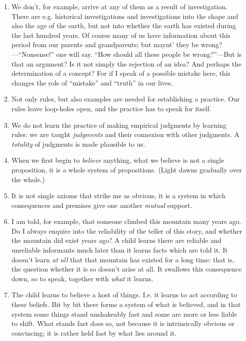 \documentclass{book}
\begin{document}
\begin{enumerate}
\item
We don't, for example, arrive at any of them as a result of investigation.
There are e.g. historical investigations and investigations into the shape and
also the age of the earth, but not into whether the earth has existed during
the last hundred years. Of course many of us have information about this period
from our parents and grandparents; but maynt' they be wrong?---``Nonsense!''
one will say. ``How should all these people be wrong?''---But is that an
argument? Is it not simply the rejection of an idea? And perhaps the
determination of a concept? For if I speak of a possible mistake here, this
changes the role of ``mistake'' and ``truth'' in our lives.

\item
Not only rules, but also examples are needed for establishing a practice. Our
rules leave loop-holes open, and the practice has to speak for itself.

\item
We do not learn the practice of making empirical judgments by learning rules:
we are taught \emph{judgments} and their connexion with other judgments. A
\emph{totality} of judgments is made plausible to us.

\item
When we first begin to \emph{believe} anything, what we believe is not a single
proposition, it is a whole system of propositions. (Light dawns gradually over
the whole.)

\item
It is not single axioms that strike me as obvious, it is a system in which
consequences and premises give one another \emph{mutual} support.

\item
I am told, for example, that someone climbed this mountain many years ago. Do I
always enquire into the reliability of the teller of this story, and whether
the mountain did exist years ago? A child learns there are reliable and
unreliable informants much later than it learns facts which are told it. It
doesn't learn \emph{at all} that that mountain has existed for a long time:
that is, the question whether it is so doesn't arise at all. It swallows this
consequence down, so to speak, together with \emph{what} it learns.

\item
The child learns to believe a host of things. I.e. it learns to act according
to these beliefs. Bit by bit there forms a system of what is believed, and in
that system some things stand unshakeably fast and some are more or less liable
to shift. What stands fast does so, not because it is intrinsically obvious or
convincing; it is rather held fast by what lies around it.


\end{enumerate}
\end{document}
